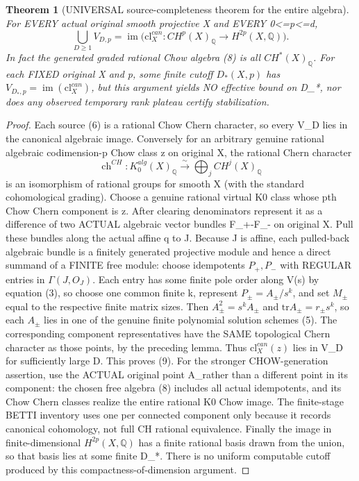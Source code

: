\documentclass[11pt]{article}
\newtheorem{theorem}{Theorem}[section]
\begin{document}
\begin{theorem}[UNIVERSAL source-completeness theorem for the entire algebra]
For EVERY actual original smooth projective X and
EVERY 0<=p<=d,
\[
 \boxed{
 \bigcup_{D\ge1}V_{D,p}
  =\operatorname{im}
      \big(\mathrm{cl}^{can}_X:
      CH^p(X)_{\mathbb Q}\to H^{2p}(X,\mathbb Q)\big).
 }                                                     \tag{9}
\]
In fact the generated graded rational Chow algebra (8)
is all \(CH^*(X)_{\mathbb Q}\).
For each FIXED original X and p, some finite cutoff
\(D_*(X,p)\) has
\(V_{D_*,p}=\operatorname{im}(\mathrm{cl}^{can}_X)\),
but this argument yields NO effective bound on D_*,
nor does any observed temporary rank plateau
certify stabilization.
\end{theorem}
\begin{proof}
Each source (6) is a rational Chow Chern character,
so every V_D lies in the canonical algebraic image.
Conversely for an arbitrary genuine rational algebraic
codimension-p Chow class z on original X,
the rational Chern character
\[
 \operatorname{ch}^{CH}:K_0^{alg}(X)_{\mathbb Q}
  \overset{\sim}{\longrightarrow}
    \bigoplus_j CH^j(X)_{\mathbb Q}
\]
is an isomorphism of rational groups for smooth X
(with the standard cohomological grading).
Choose a genuine rational virtual K0 class
whose pth Chow Chern component is z.
After clearing denominators represent it as
a difference of two ACTUAL algebraic vector bundles
F_+-F_- on original X.
Pull these bundles along the actual affine q to J.
Because J is affine, each pulled-back
algebraic bundle is a finitely generated projective
module and hence a direct summand of a FINITE free
module: choose idempotents \(P_+,P_-\)
with REGULAR entries in \(\Gamma(J,O_J)\).
Each entry has some finite pole order along V(s)
by equation (3), so choose one common finite k,
represent \(P_\pm=A_\pm/s^k\), and set
\(M_\pm\) equal to the respective finite matrix sizes.
Then \(A_\pm^2=s^k A_\pm\) and
\(\mathrm{tr}A_\pm=r_\pm s^k\),
so each \(A_\pm\) lies in one of the genuine
finite polynomial solution schemes (5).
The corresponding component representatives
have the SAME topological Chern character
as those points, by the preceding lemma.
Thus \(\mathrm{cl}_X^{can}(z)\) lies in V_D
for sufficiently large D. This proves (9).
For the stronger CHOW-generation assertion,
use the ACTUAL original point A_\pm rather than
a different point in its component: the
chosen free algebra (8) includes all actual
idempotents, and its Chow Chern classes realize
the entire rational K0 Chow image.
The finite-stage BETTI inventory uses one
per connected component only because it records
canonical cohomology, not full CH rational
equivalence.
Finally the image in finite-dimensional
\(H^{2p}(X,\mathbb Q)\) has a finite
rational basis drawn from the union,
so that basis lies at some finite D_*.
There is no uniform computable cutoff produced
by this compactness-of-dimension argument.
\end{proof}
\end{document}
